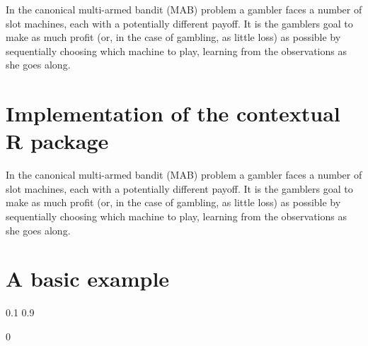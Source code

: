 \documentclass[nojss]{jss}
\begin{document}
In the canonical multi-armed bandit (MAB) problem a gambler faces a number of slot machines, each with a potentially different payoff. It is the gamblers goal to make as much profit (or, in the case of gambling, as little loss) as possible by sequentially choosing which machine to play, learning from the observations as she goes along.

\section{Implementation of the contextual R package}

In the canonical multi-armed bandit (MAB) problem a gambler faces a number of slot machines, each with a potentially different payoff. It is the gamblers goal to make as much profit (or, in the case of gambling, as little loss) as possible by sequentially choosing which machine to play, learning from the observations as she goes along.

\section{A basic example}

\begin{Schunk}
\begin{Soutput}
     [,1] [,2]
[1,]  0.1  0.9
\end{Soutput}
\begin{Soutput}
[1] 0
\end{Soutput}
\end{Schunk}
\end{document}
